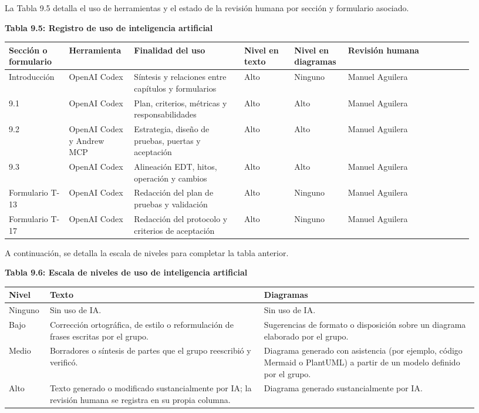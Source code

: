 \documentclass[11pt]{article}
\begin{document}
La Tabla 9.5 detalla el uso de herramientas y el estado de la revisión humana por sección y formulario asociado.

\textbf{Tabla 9.5: Registro de uso de inteligencia artificial}\label{tab:9-5}

\begin{longtable}{p{0.12\linewidth}p{0.13\linewidth}p{0.22\linewidth}p{0.10\linewidth}p{0.10\linewidth}p{0.25\linewidth}}
\toprule
Sección o formulario & Herramienta & Finalidad del uso & Nivel en texto & Nivel en diagramas & Revisión humana \\
\midrule
\endhead
Introducción & OpenAI Codex & Síntesis y relaciones entre capítulos y formularios & Alto & Ninguno & Manuel Aguilera \\
9.1 & OpenAI Codex & Plan, criterios, métricas y responsabilidades & Alto & Alto & Manuel Aguilera \\
9.2 & OpenAI Codex y Andrew MCP & Estrategia, diseño de pruebas, puertas y aceptación & Alto & Alto & Manuel Aguilera \\
9.3 & OpenAI Codex & Alineación EDT, hitos, operación y cambios & Alto & Alto & Manuel Aguilera \\
Formulario T-13 & OpenAI Codex & Redacción del plan de pruebas y validación & Alto & Ninguno & Manuel Aguilera \\
Formulario T-17 & OpenAI Codex & Redacción del protocolo y criterios de aceptación & Alto & Ninguno & Manuel Aguilera \\
\bottomrule
\end{longtable}

A continuación, se detalla la escala de niveles para completar la tabla anterior.

\textbf{Tabla 9.6: Escala de niveles de uso de inteligencia artificial}\label{tab:9-6}

\begin{tabular}{@{}p{0.069\linewidth}p{0.429\linewidth}p{0.429\linewidth}@{}}
\toprule Nivel & Texto & Diagramas \\
\midrule
Ninguno & Sin uso de IA. & Sin uso de IA. \\
Bajo & Corrección ortográfica, de estilo o reformulación de frases escritas por el grupo. & Sugerencias de formato o disposición sobre un diagrama elaborado por el grupo. \\
Medio & Borradores o síntesis de partes que el grupo reescribió y verificó. & Diagrama generado con asistencia (por ejemplo, código Mermaid o PlantUML) a partir de un modelo definido por el grupo. \\
Alto & Texto generado o modificado sustancialmente por IA; la revisión humana se registra en su propia columna. & Diagrama generado sustancialmente por IA. \\
\bottomrule
\end{tabular}

\ossFinalPage
\end{document}
